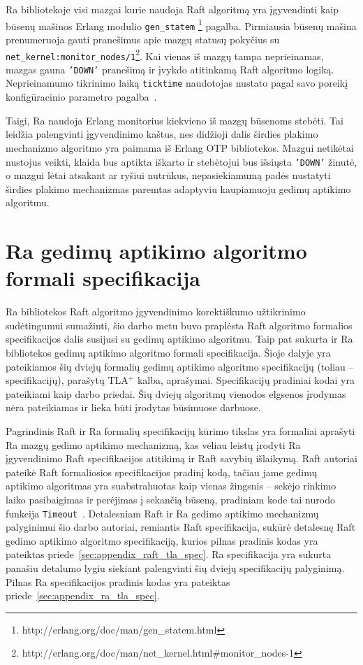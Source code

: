 \documentclass{VUMIFPSkursinis}
\begin{document}
Ra bibliotekoje visi mazgai kurie naudoja Raft algoritmą yra įgyvendinti kaip būsenų mašinos Erlang modulio \texttt{gen\_statem} \footnote{http://erlang.org/doc/man/gen\_statem.html} pagalba. 
Pirmiausia būsenų mašina prenumeruoja gauti pranešimus apie mazgų statusų pokyčius su \texttt{net\_kernel:monitor\_nodes/1}\footnote{http://erlang.org/doc/man/net\_kernel.html\#monitor\_nodes-1}. Kai vienas iš mazgų tampa neprieinamas, mazgas gauna \texttt{'DOWN'} pranešimą ir įvykdo atitinkamą Raft algoritmo logiką. Neprieinamumo tikrinimo laiką \texttt{ticktime} naudotojas nustato pagal savo poreikį konfigūracinio parametro pagalba~\cite{rabbitmqra}.

Taigi, Ra naudoja Erlang monitorius kiekvieno iš mazgų būsenoms stebėti. Tai leidžia palengvinti įgyvendinimo kaštus, nes didžioji dalis širdies plakimo mechanizmo algoritmo yra paimama iš Erlang OTP bibliotekos. Mazgui netikėtai nustojus veikti, klaida bus aptikta iškarto ir stebėtojui bus išsiųsta \texttt{'DOWN'} žinutė, o mazgui lėtai atsakant ar ryšiui nutrūkus, nepasiekiamumą padės nustatyti širdies plakimo mechanizmas paremtas adaptyviu kaupiamuoju gedimų aptikimo algoritmu.

\section{Ra gedimų aptikimo algoritmo formali specifikacija}

Ra bibliotekos Raft algoritmo įgyvendinimo korektiškumo užtikrinimo sudėtingumui sumažinti, šio darbo metu buvo praplėsta Raft algoritmo formalios specifikacijos dalis susijusi su gedimų aptikimo algoritmu. Taip pat sukurta ir Ra bibliotekos gedimų aptikimo algoritmo formali specifikacija. Šioje dalyje yra pateikiamos šių dviejų formalių gedimų aptikimo algoritmo specifikacijų (toliau -- specifikacijų), parašytų TLA$^+$ kalba, aprašymai. Specifikacijų pradiniai kodai yra pateikiami kaip darbo priedai. Šių dviejų algoritmų vienodos elgsenos įrodymas nėra pateikiamas ir lieka būti įrodytas būsimuose darbuose. 

Pagrindinis Raft ir Ra formalių specifikacijų kūrimo tikslas yra formaliai aprašyti Ra mazgų gedimo aptikimo mechanizmą, kas vėliau leistų įrodyti Ra įgyvendinimo Raft specifikacijos atitikimą ir Raft savybių išlaikymą. Raft autoriai pateikė Raft formaliosios specifikacijos pradinį kodą, tačiau jame gedimų aptikimo algoritmas yra suabstrahuotas kaip vienas žingsnis -- sekėjo rinkimo laiko pasibaigimas ir perėjimas į sekančią būseną, pradiniam kode tai nurodo funkcija \texttt{Timeout}~\cite{ongaro_consensus}. Detalesniam Raft ir Ra gedimo aptikimo mechanizmų palyginimui šio darbo autoriai, remiantis Raft specifikacija, sukūrė detalesnę Raft gedimo aptikimo algoritmo specifikaciją, kurios pilnas pradinis kodas yra pateiktas priede~\ref{sec:appendix_raft_tla_spec}. Ra specifikacija yra sukurta panašiu detalumo lygiu siekiant palengvinti šių dviejų specifikacijų palyginimą. Pilnas Ra specifikacijos pradinis kodas yra pateiktas priede~\ref{sec:appendix_ra_tla_spec}.
\end{document}

